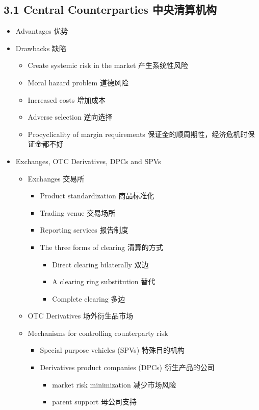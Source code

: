 \documentclass[a4paper,6pt,twoside,openany]{article}
\begin{document}
\subsection*{3.1 Central Counterparties 中央清算机构}
\begin{itemize}
\item Advantages 优势
\item Drawbacks 缺陷
  \begin{itemize}
  \item Create systemic risk in the market 产生系统性风险
  \item Moral hazard problem 道德风险
  \item Increased costs 增加成本
  \item Adverse selection 逆向选择
    \item Procyclicality of margin requirements 保证金的顺周期性，经济危机时保证金都不好
  \end{itemize}
\item Exchanges, OTC Derivatives, DPCs and SPVs
  \begin{itemize}
  \item Exchanges 交易所
    \begin{itemize}
    \item Product standardization 商品标准化
    \item Trading venue 交易场所
    \item Reporting services 报告制度
    \item The three forms of clearing 清算的方式
      \begin{itemize}
      \item Direct clearing bilaterally 双边
      \item A clearing ring substitution 替代
      \item Complete clearing 多边
      \end{itemize}
    \end{itemize}
  \item OTC Derivatives 场外衍生品市场
  \item Mechanisms for controlling counterparty risk
    \begin{itemize}
    \item Special purpose vehicles (SPVs) 特殊目的机构
    \item Derivatives product companies (DPCs) 衍生产品的公司
      \begin{itemize}
      \item market risk minimization 减少市场风险
      \item parent support 母公司支持

\end{itemize}
\end{itemize}
\end{itemize}
\end{itemize}
\end{document}
